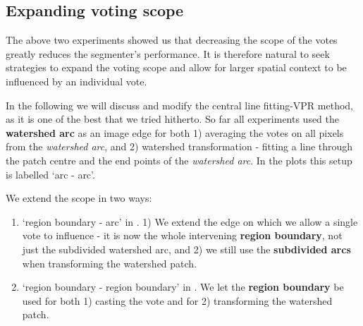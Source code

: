 \subsection{Expanding voting scope}
The above two experiments showed us that decreasing the scope of the votes greatly reduces the segmenter's performance. It is therefore natural to seek strategies to expand the voting scope and allow for larger spatial context to be influenced by an individual vote.

In the following we will discuss and modify the central line fitting-VPR method, as it is one of the best that we tried hitherto. So far all experiments used the {\bf watershed arc} as an image edge for both 1) averaging the votes on all pixels from the {\it watershed arc}, and 2) watershed transformation - fitting a line through the patch centre and the end points of the {\it watershed arc}. In the plots  this setup is labelled `arc - arc'.

%
% 
% 
% 


We extend the scope in two ways:
\begin{enumerate}
 \item{`region boundary - arc'} in . 1) We extend the edge on which we allow a single vote to influence - it is now the whole intervening {\bf region boundary}, not just the subdivided watershed arc, and 2) we still use the {\bf subdivided arcs} when transforming the watershed patch. 
 \item{`region boundary - region boundary'} in . We let the {\bf region boundary} be used for both 1) casting the vote and for 2) transforming the watershed patch.
\end{enumerate}


